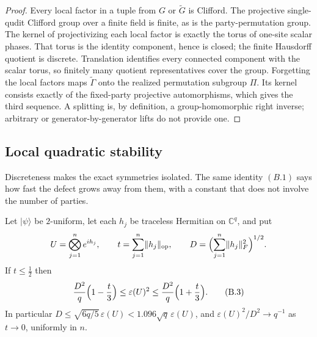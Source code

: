 \begin{proof}
Every local factor in a tuple from \(G\) or \(\widetilde G\) is
Clifford.  The projective
single-qudit Clifford group over a finite field is finite, as is the
party-permutation group.  The kernel of projectivizing each local factor
is exactly the torus of one-site scalar phases.  That torus is the
identity component, hence is closed; the finite Hausdorff quotient is
discrete.  Translation identifies every connected component with the
scalar torus, so finitely many quotient representatives cover the group.
Forgetting the local factors maps
\(\widetilde\Gamma\) onto the realized permutation subgroup \(\Pi\).
Its kernel consists exactly of the fixed-party projective
automorphisms, which gives the third sequence.  A splitting is, by
definition, a group-homomorphic right inverse; arbitrary or
generator-by-generator lifts do not provide one.
\end{proof}


\subsection{Local quadratic stability}

Discreteness makes the exact symmetries isolated.  The same identity
\((B.1)\) says how fast the defect grows away from them, with a constant
that does not involve the number of parties.

\begin{theorem}\label{thm:two-uniform-stability}
Let \(\lvert\psi\rangle\) be \(2\)-uniform, let each \(h_j\) be traceless
Hermitian on \(\mathbb C^q\), and put
\[
 U=\bigotimes_{j=1}^ne^{ih_j},\qquad
 t=\sum_{j=1}^n\lVert h_j\rVert_{\mathrm{op}},\qquad
 D=\Bigl(\sum_{j=1}^n\lVert h_j\rVert_F^2\Bigr)^{1/2}.
\]
If \(t\leq\frac12\) then
\[
 \frac{D^2}q\Bigl(1-\frac t3\Bigr)\leq\varepsilon(U)^2
 \leq\frac{D^2}q\Bigl(1+\frac t3\Bigr).                  \tag{B.3}
\]
In particular \(D\leq\sqrt{6q/5}\,\varepsilon(U)<1.096\sqrt q\,
\varepsilon(U)\), and \(\varepsilon(U)^2/D^2\to q^{-1}\) as \(t\to0\),
uniformly in \(n\).
\end{theorem}

